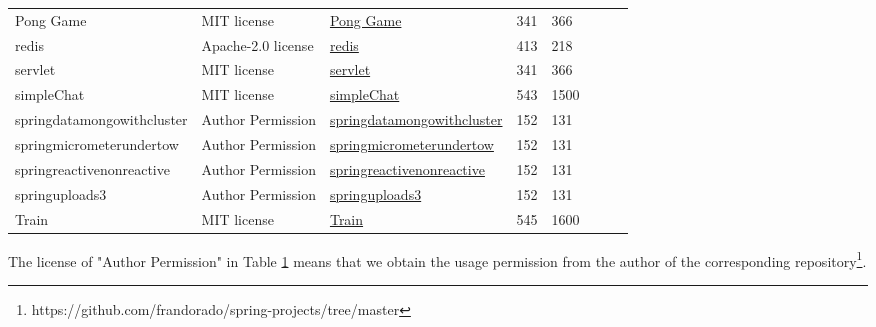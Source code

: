 \begin{table}[t]
{\begin{tabular}{llllllll}
Pong Game &MIT license &\href{https://github.com/kishanrajput23/Java-Projects-Collections/tree/main/Pong\%20Game}{Pong Game} &341 &366 \\
redis &Apache-2.0 license &\href{https://github.com/mybatis/redis-cache}{redis} &413 &218 \\
servlet &MIT license &\href{https://github.com/kishanrajput23/Java-Projects-Collections/tree/main/Online\%20Voting\%20System/Online_Voting_System/src/main/java/vote/com/servlet}{servlet} &341 &366 \\
simpleChat &MIT license &\href{https://github.com/abhpd/hacktoberfest2021/tree/main/Java/Projects/SimpleChat}{simpleChat} &543 &1500 \\
springdatamongowithcluster &Author Permission &\href{https://github.com/frandorado/spring-projects/tree/master/spring-data-mongo-with-cluster}{springdatamongowithcluster} &152 &131 \\
springmicrometerundertow &Author Permission &\href{https://github.com/frandorado/spring-projects/tree/master/spring-micrometer-undertow}{springmicrometerundertow} &152 &131 \\
springreactivenonreactive &Author Permission &\href{https://github.com/frandorado/spring-projects/tree/master/spring-reactive-nonreactive}{springreactivenonreactive} &152 &131 \\
springuploads3 &Author Permission &\href{https://github.com/frandorado/spring-projects/tree/master/spring-upload-s3-localstack}{springuploads3} &152 &131 \\
Train &MIT license &\href{https://github.com/abhpd/hacktoberfest2021/tree/main/Java/Projects/Train}{Train} &545 &1600 \\
\hline
\end{tabular}
}
\label{tab: individual_dataset_java}
\end{table}

The license of "Author Permission" in Table \ref{tab: individual_dataset_java} means that we obtain the usage permission from the author of the corresponding repository\footnote{https://github.com/frandorado/spring-projects/tree/master}.


